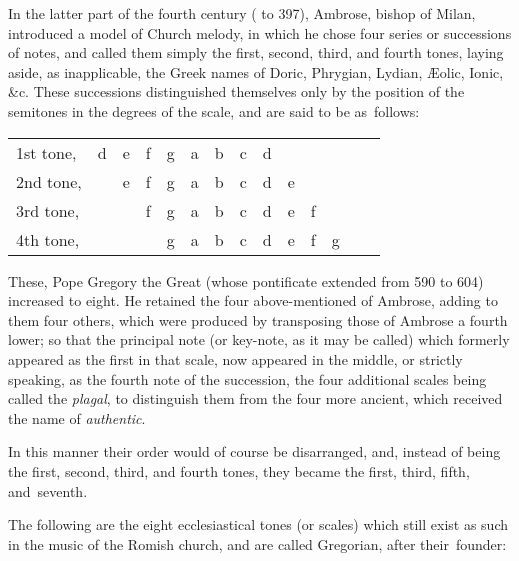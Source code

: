 In the latter part of the fourth century ( to 397), Ambrose, bishop of
Milan, introduced a model of Church melody, in which he chose four series
or successions of notes, and called them simply the first, second, third, and fourth
tones, laying aside, as inapplicable, the Greek names of Doric, Phrygian, Lydian,
Æolic, Ionic, \&c. These successions distinguished themselves only by the position
of the semitones in the degrees of the scale, and are said to be as~follows:

\begin{center}
\begin{tabular}{llllllllllllll}
1st tone, & d & e & f & g & a & b & c & d \\
2nd tone, &\raisebox{1.5pt}{\rule{1em}{1pt}} & e & f & g & a & b & c & d & e \\
3rd tone, &\multicolumn{2}{c}{\raisebox{2pt}{\rule{3em}{1pt}}}& f & g & a & b & c & d & e & f \\
4th tone, &\multicolumn{3}{c}{\raisebox{2pt}{\rule{5em}{1pt}}} & g & a & b & c & d & e & f & g \\
\end{tabular}
\end{center}

These, Pope Gregory the Great (whose pontificate extended from 590 to 604)
increased to eight. He retained the four above-mentioned of Ambrose, adding to
them four others, which were produced by transposing those of Ambrose a fourth
lower; so that the principal note (or key-note, as it may be called) which formerly
appeared as the first in that scale, now appeared in the middle, or strictly
speaking, as the fourth note of the succession, the four additional scales being
called the \textit{plagal}, to distinguish them from the four more ancient, which received
the name of \textit{authentic}.

In this manner their order would of course be disarranged, and, instead of being
the first, second, third, and fourth tones, they became the first, third, fifth, and~seventh.

The following are the eight ecclesiastical tones (or scales) which still exist as such
in the music of the Romish church, and are called Gregorian, after their~founder:

